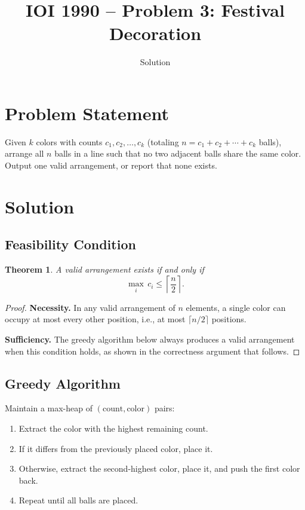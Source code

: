 \documentclass[11pt,a4paper]{article}
\title{IOI 1990 -- Problem 3: Festival Decoration}
\author{Solution}
\date{}
\newtheorem{theorem}{Theorem}
\begin{document}
\maketitle

\section{Problem Statement}

Given $k$ colors with counts $c_1, c_2, \ldots, c_k$ (totaling
$n = c_1 + c_2 + \cdots + c_k$ balls), arrange all $n$ balls in a line such
that no two adjacent balls share the same color. Output one valid arrangement,
or report that none exists.

\section{Solution}

\subsection{Feasibility Condition}

\begin{theorem}
A valid arrangement exists if and only if
\[
  \max_i\, c_i \le \left\lceil \frac{n}{2} \right\rceil.
\]
\end{theorem}
\begin{proof}
\textbf{Necessity.} In any valid arrangement of $n$ elements, a single color
can occupy at most every other position, i.e., at most $\lceil n/2 \rceil$
positions.

\textbf{Sufficiency.} The greedy algorithm below always produces a valid
arrangement when this condition holds, as shown in the correctness argument
that follows.
\end{proof}

\subsection{Greedy Algorithm}

Maintain a max-heap of $(\text{count}, \text{color})$ pairs:

\begin{enumerate}
  \item Extract the color with the highest remaining count.
  \item If it differs from the previously placed color, place it.
  \item Otherwise, extract the second-highest color, place it, and push
    the first color back.
  \item Repeat until all balls are placed.
\end{enumerate}
\end{document}
